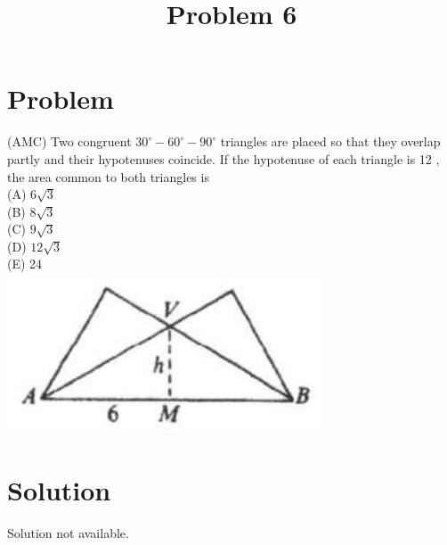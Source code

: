 \documentclass{article}
\title{Problem 6}
\date{}
\begin{document}
\maketitle

\section*{Problem}
(AMC) Two congruent \(30^{\circ}-60^{\circ}-90^{\circ}\) triangles are placed so that they overlap partly and their hypotenuses coincide. If the hypotenuse of each triangle is 12 , the area common to both triangles is\\
(A) \(6 \sqrt{3}\)\\
(B) \(8 \sqrt{3}\)\\
(C) \(9 \sqrt{3}\)\\
(D) \(12 \sqrt{3}\)\\
(E) 24\\
\centering
\includegraphics[width=\textwidth]{images/089.jpg}

\section*{Solution}
Solution not available.
\end{document}
